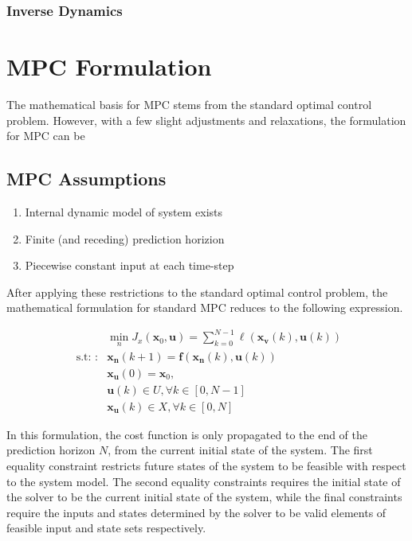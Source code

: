 \documentclass[journal]{IEEEtran}
\begin{document}
\subsubsection{Inverse Dynamics}





\section{MPC Formulation}

The mathematical basis for MPC stems from the standard optimal control problem. However, with a few slight adjustments and relaxations, the formulation for MPC can be


\subsection{MPC Assumptions}

\begin{enumerate}
  \item Internal dynamic model of system exists
  \item Finite (and receding) prediction horizion
  \item Piecewise constant input at each time-step \\
\end{enumerate}

After applying these restrictions to the standard optimal control problem, the mathematical formulation for standard MPC reduces to the following expression.

\begin{equation}
\begin{aligned}
& \min _{n} J_{x}\left(\mathbf{x}_{0}, \mathbf{u}\right)=\sum_{k=0}^{N-1} \ell\left(\mathbf{x}_{\mathbf{v}}(k), \mathbf{u}(k)\right) \\
\text { s.t: }: & \mathbf{x}_{\mathbf{n}}(k+1)=\mathbf{f}\left(\mathbf{x}_{\mathbf{n}}(k), \mathbf{u}(k)\right) \\
& \mathbf{x}_{\mathbf{u}}(0)=\mathbf{x}_{0}, \\
& \mathbf{u}(k) \in U, \forall k \in[0, N-1] \\
& \mathbf{x}_{\mathbf{u}}(k) \in X, \forall k \in[0, N]
\end{aligned}
\end{equation}

In this formulation, the cost function is only propagated to the end of the prediction horizon $N$, from the current initial state of the system. The first equality constraint restricts future states of the system to be feasible with respect to the system model. The second equality constraints requires the initial state of the solver to be the current initial state of the system, while the final constraints require the inputs and states determined by the solver to be valid elements of feasible input and state sets respectively. \\
\end{document}
